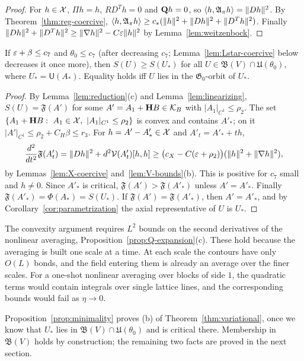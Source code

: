 \begin{proof}
For $h\in\mathcal X$, $\Pi h=h$, $RD^Th=0$ and $\mathbf Q h=0$, so $\langle h,\mathfrak A_\pi h\rangle=\|Dh\|^2$. By Theorem~\ref{thm:reg-coercive}, $\langle h,\mathfrak A_\pi h\rangle\ge c_*(\|h\|^2+\|Dh\|^2+\|D^Th\|^2)$. Finally $\|Dh\|^2+\|D^Th\|^2\ge\|\nabla h\|^2-C\varepsilon\|h\|^2$ by Lemma~\ref{lem:weitzenbock}.
\end{proof}

\begin{proposition}[Minimality]\label{prop:minimality}
If $\varepsilon+\beta\le c_7$ and $\theta_0\le c_7$ (after decreasing $c_7$; Lemma~\ref{lem:Lstar-coercive} below decreases it once more), then $S(U)\ge S(U_*)$ for all $U\in\mathfrak B(V)\cap\mathfrak U(\theta_0)$, where $U_*=\mathsf U(A_*)$. Equality holds iff $U$ lies in the $\mathfrak G_0$-orbit of $U_*$.
\end{proposition}

\begin{proof}
By Lemma~\ref{lem:reduction}(c) and Lemma~\ref{lem:linearizing}, $S(U)=\mathfrak F(A')$ for some $A'=A_1+\mathbf H B\in\mathcal K_B$ with $|A_1|_{C^1}\le\rho_2$. The set $\{A_1+\bH B:\ A_1\in\cX,\ |A_1|_{C^1}\le\rho_2\}$ is convex and contains $A'_*$; on it $|A'|_{C^1}\le\rho_2+C_H\beta\le r_3$. For $h=A'-A'_*\in\mathcal X$ and $A'_t=A'_*+th$,
\[
\frac{d^2}{dt^2}\mathfrak F(A'_t)=\|Dh\|^2+d^2\mathcal V(A'_t)[h,h]\ge\big(c_X-C(\varepsilon+\rho_2)\big)(\|h\|^2+\|\nabla h\|^2),
\]
by Lemmas~\ref{lem:X-coercive} and~\ref{lem:V-bounds}(b). This is positive for $c_7$ small and $h\ne0$. Since $A'_*$ is critical, $\mathfrak F(A')>\mathfrak F(A'_*)$ unless $A'=A'_*$. Finally $\mathfrak F(A'_*)=\Phi(A_*)=S(U_*)$. If $\mathfrak F(A')=\mathfrak F(A'_*)$, then $A'=A'_*$, and by Corollary~\ref{cor:parametrization} the axial representative of $U$ is $U_*$.
\end{proof}

The convexity argument requires $L^2$ bounds on the second derivatives of the nonlinear averaging, Proposition~\ref{prop:Q-expansion}(c). These hold because the averaging is built one scale at a time. At each scale the contours have only $O(L)$ bonds, and the field entering them is already an average over the finer scales. For a one-shot nonlinear averaging over blocks of side $1$, the quadratic terms would contain integrals over single lattice lines, and the corresponding bounds would fail as $\eta\to0$.

Proposition~\ref{prop:minimality} proves (b) of Theorem~\ref{thm:variational}, once we know that $U_*$ lies in $\mathfrak B(V)\cap\mathfrak U(\theta_0)$ and is critical there. Membership in $\mathfrak B(V)$ holds by construction; the remaining two facts are proved in the next section.

